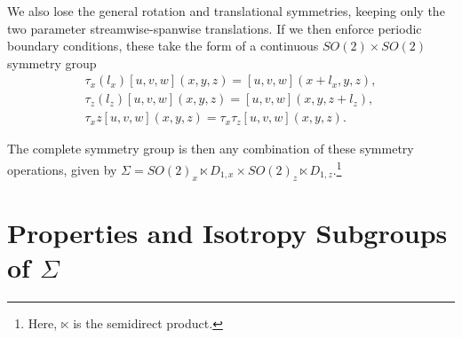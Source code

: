 We also lose the general rotation and translational symmetries, keeping only the two parameter streamwise-spanwise translations. If we then enforce periodic boundary conditions, these take the form of a continuous $SO(2)\times SO(2)$ symmetry group 
\begin{align}
\tau_x(l_x)[u,v,w](x,y,z) = [u,v,w](x+l_x,y,z),\label{eq:contsymm}\\
\tau_z(l_z)[u,v,w](x,y,z) = [u,v,w](x,y,z+l_z),\\
\tau_xz[u,v,w](x,y,z) = \tau_x\tau_z[u,v,w](x,y,z).
\end{align}

The complete symmetry group is then any combination of these symmetry operations, given by $\Sigma = SO(2)_x \ltimes D_{1,x} \times SO(2)_z \ltimes D_{1,z}.$\footnote{Here, $\ltimes$ is the semidirect product.}
\section{Properties and Isotropy Subgroups of $\Sigma$}


